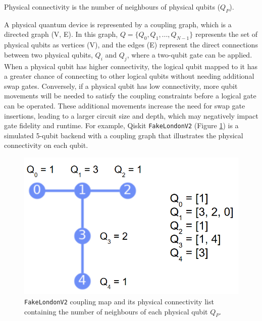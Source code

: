 \begin{definition} %
    Physical connectivity is the number of neighbours of physical qubits ($Q_P$).
\end{definition}
A physical quantum device is represented by a coupling graph, which is a directed graph (V, E). In this graph, $Q = \{Q_0, Q_1, ..., Q_{N-1}\}$ represents the set of physical qubits as vertices (V), and the edges (E) represent the direct connections between two physical qubits, $Q_i$ and $Q_j$, where a two-qubit gate can be applied. When a physical qubit has higher connectivity, the logical qubit mapped to it has a greater chance of connecting to other logical qubits without needing additional swap gates. Conversely, if a physical qubit has low connectivity, more qubit movements will be needed to satisfy the coupling constraints before a logical gate can be operated. These additional movements increase the need for swap gate insertions, leading to a larger circuit size and depth, which may negatively impact gate fidelity and runtime. For example, Qiskit \lstinline{FakeLondonV2} \cite{ibmquantum_fakelondonv2} (Figure \ref{fig:fake-london})  is a simulated 5-qubit backend with a coupling graph that illustrates the physical connectivity on each qubit.
\begin{figure}[h]
    \centering
    \includegraphics[width=0.4\linewidth]{image/fake_london.png}
    \caption{\lstinline{FakeLondonV2} coupling map and its physical connectivity list containing the number of neighbours of each physical qubit $Q_P$.}
    \label{fig:fake-london}
\end{figure}

